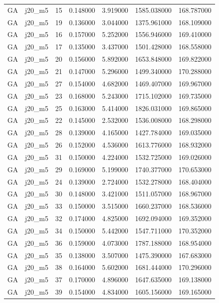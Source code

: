 \begin{tabular}{llrrrrr}
GA & j20_m5 & 15 & 0.148000 & 3.919000 & 1585.038000 & 168.787000 \\
GA & j20_m5 & 19 & 0.136000 & 3.044000 & 1375.961000 & 168.109000 \\
GA & j20_m5 & 16 & 0.157000 & 5.252000 & 1556.946000 & 169.410000 \\
GA & j20_m5 & 17 & 0.135000 & 3.437000 & 1501.428000 & 168.558000 \\
GA & j20_m5 & 20 & 0.156000 & 5.892000 & 1653.848000 & 169.822000 \\
GA & j20_m5 & 21 & 0.147000 & 5.296000 & 1499.340000 & 170.288000 \\
GA & j20_m5 & 27 & 0.154000 & 4.682000 & 1469.407000 & 169.967000 \\
GA & j20_m5 & 23 & 0.168000 & 5.243000 & 1715.102000 & 169.735000 \\
GA & j20_m5 & 25 & 0.163000 & 5.414000 & 1826.031000 & 169.865000 \\
GA & j20_m5 & 22 & 0.145000 & 2.532000 & 1536.008000 & 168.298000 \\
GA & j20_m5 & 28 & 0.139000 & 4.165000 & 1427.784000 & 169.035000 \\
GA & j20_m5 & 26 & 0.152000 & 4.536000 & 1613.776000 & 168.932000 \\
GA & j20_m5 & 31 & 0.150000 & 4.224000 & 1532.725000 & 169.026000 \\
GA & j20_m5 & 29 & 0.169000 & 5.199000 & 1740.377000 & 170.653000 \\
GA & j20_m5 & 24 & 0.139000 & 2.724000 & 1532.278000 & 168.404000 \\
GA & j20_m5 & 30 & 0.148000 & 3.421000 & 1511.057000 & 168.967000 \\
GA & j20_m5 & 33 & 0.150000 & 3.515000 & 1660.237000 & 168.536000 \\
GA & j20_m5 & 32 & 0.174000 & 4.825000 & 1692.094000 & 169.352000 \\
GA & j20_m5 & 34 & 0.150000 & 5.442000 & 1547.711000 & 170.352000 \\
GA & j20_m5 & 36 & 0.159000 & 4.073000 & 1787.188000 & 168.954000 \\
GA & j20_m5 & 35 & 0.138000 & 3.507000 & 1475.390000 & 167.683000 \\
GA & j20_m5 & 38 & 0.164000 & 5.602000 & 1681.444000 & 170.296000 \\
GA & j20_m5 & 37 & 0.170000 & 4.896000 & 1647.635000 & 169.138000 \\
GA & j20_m5 & 39 & 0.154000 & 4.834000 & 1605.156000 & 169.165000 \\

\end{tabular}
